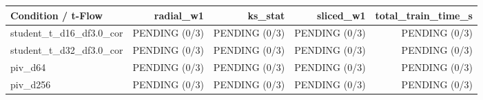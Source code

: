 \begin{tabular}{lrrrr}
\hline
Condition / t-Flow & radial\_w1 & ks\_stat & sliced\_w1 & total\_train\_time\_s \\
\hline
student\_t\_d16\_df3.0\_cor & PENDING (0/3) & PENDING (0/3) & PENDING (0/3) & PENDING (0/3) \\
student\_t\_d32\_df3.0\_cor & PENDING (0/3) & PENDING (0/3) & PENDING (0/3) & PENDING (0/3) \\
piv\_d64 & PENDING (0/3) & PENDING (0/3) & PENDING (0/3) & PENDING (0/3) \\
piv\_d256 & PENDING (0/3) & PENDING (0/3) & PENDING (0/3) & PENDING (0/3) \\
\hline
\end{tabular}

